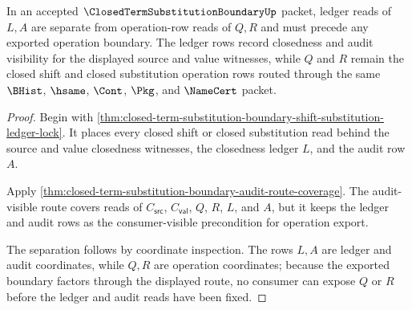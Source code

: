 \begin{theorem}
\label{thm:closed-term-substitution-boundary-ledger-route-separation}
In an accepted $\ClosedTermSubstitutionBoundaryUp$ packet, ledger reads of $L,A$ are separate from operation-row reads of $Q,R$ and must precede any exported operation boundary. The ledger rows record closedness and audit visibility for the displayed source and value witnesses, while $Q$ and $R$ remain the closed shift and closed substitution operation rows routed through the same $\BHist$, $\hsame$, $\Cont$, $\Pkg$, and $\NameCert$ packet.
\end{theorem}
\begin{proof}
Begin with \autoref{thm:closed-term-substitution-boundary-shift-substitution-ledger-lock}. It places every closed shift or closed substitution read behind the source and value closedness witnesses, the closedness ledger $L$, and the audit row $A$.

Apply \autoref{thm:closed-term-substitution-boundary-audit-route-coverage}. The audit-visible route covers reads of $C_{\mathsf{src}}$, $C_{\mathsf{val}}$, $Q$, $R$, $L$, and $A$, but it keeps the ledger and audit rows as the consumer-visible precondition for operation export.

The separation follows by coordinate inspection. The rows $L,A$ are ledger and audit coordinates, while $Q,R$ are operation coordinates; because the exported boundary factors through the displayed route, no consumer can expose $Q$ or $R$ before the ledger and audit reads have been fixed.
\end{proof}

